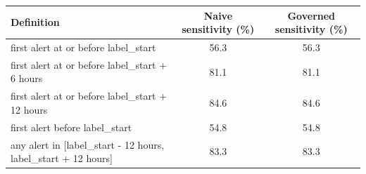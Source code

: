 \begin{tabular}{@{}lcc@{}}
\toprule
Definition & Naive sensitivity (\%) & Governed sensitivity (\%) \\
\midrule
first alert at or before label\_start & 56.3 & 56.3 \\
first alert at or before label\_start + 6 hours & 81.1 & 81.1 \\
first alert at or before label\_start + 12 hours & 84.6 & 84.6 \\
first alert before label\_start & 54.8 & 54.8 \\
any alert in [label\_start - 12 hours, label\_start + 12 hours] & 83.3 & 83.3 \\
\bottomrule
\end{tabular}
